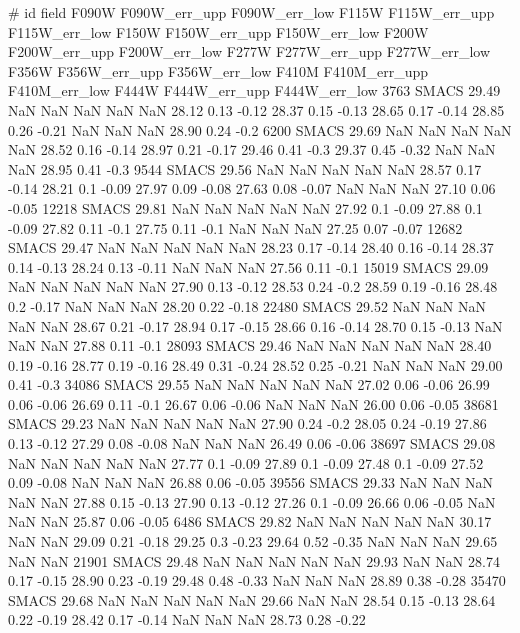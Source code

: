 # id field F090W F090W_err_upp F090W_err_low F115W F115W_err_upp F115W_err_low F150W  F150W_err_upp F150W_err_low F200W  F200W_err_upp F200W_err_low F277W  F277W_err_upp F277W_err_low F356W  F356W_err_upp F356W_err_low F410M  F410M_err_upp F410M_err_low F444W F444W_err_upp F444W_err_low
3763   SMACS   29.49 NaN NaN    NaN NaN NaN  28.12 0.13 -0.12    28.37 0.15 -0.13    28.65 0.17 -0.14    28.85 0.26 -0.21    NaN NaN NaN   28.90 0.24 -0.2
6200   SMACS   29.69 NaN NaN    NaN NaN NaN  28.52 0.16 -0.14    28.97 0.21 -0.17    29.46 0.41 -0.3    29.37 0.45 -0.32    NaN NaN NaN   28.95 0.41 -0.3
		9544   SMACS   29.56 NaN NaN   NaN NaN NaN  28.57 0.17 -0.14    28.21 0.1 -0.09    27.97 0.09 -0.08    27.63 0.08 -0.07    NaN NaN NaN   27.10 0.06 -0.05
		12218   SMACS   29.81 NaN NaN   NaN NaN NaN  27.92 0.1 -0.09    27.88 0.1 -0.09    27.82 0.11 -0.1    27.75 0.11 -0.1    NaN NaN NaN   27.25 0.07 -0.07
		12682   SMACS   29.47 NaN NaN   NaN NaN NaN  28.23 0.17 -0.14    28.40 0.16 -0.14    28.37 0.14 -0.13    28.24 0.13 -0.11    NaN NaN NaN   27.56 0.11 -0.1
		15019   SMACS   29.09 NaN NaN   NaN NaN NaN  27.90 0.13 -0.12    28.53 0.24 -0.2    28.59 0.19 -0.16    28.48 0.2 -0.17    NaN NaN NaN   28.20 0.22 -0.18
		22480   SMACS   29.52 NaN NaN   NaN NaN NaN  28.67 0.21 -0.17    28.94 0.17 -0.15    28.66 0.16 -0.14    28.70 0.15 -0.13    NaN NaN NaN   27.88 0.11 -0.1
		28093   SMACS   29.46 NaN NaN   NaN NaN NaN  28.40 0.19 -0.16    28.77 0.19 -0.16    28.49 0.31 -0.24    28.52 0.25 -0.21    NaN NaN NaN   29.00 0.41 -0.3
		34086   SMACS   29.55 NaN NaN   NaN NaN NaN  27.02 0.06 -0.06    26.99 0.06 -0.06    26.69 0.11 -0.1    26.67 0.06 -0.06    NaN NaN NaN   26.00 0.06 -0.05
		38681   SMACS   29.23 NaN NaN   NaN NaN NaN  27.90 0.24 -0.2    28.05 0.24 -0.19    27.86 0.13 -0.12    27.29 0.08 -0.08    NaN NaN NaN   26.49 0.06 -0.06
		38697   SMACS   29.08 NaN NaN   NaN NaN NaN   27.77 0.1 -0.09    27.89 0.1 -0.09    27.48 0.1 -0.09    27.52 0.09 -0.08    NaN NaN NaN   26.88 0.06 -0.05
		39556   SMACS   29.33 NaN NaN   NaN NaN NaN   27.88 0.15 -0.13    27.90 0.13 -0.12    27.26 0.1 -0.09    26.66 0.06 -0.05    NaN NaN NaN   25.87 0.06 -0.05
		6486   SMACS   29.82 NaN NaN   NaN NaN NaN  30.17 NaN NaN    29.09 0.21 -0.18    29.25 0.3 -0.23    29.64 0.52 -0.35    NaN NaN NaN   29.65 NaN NaN
		21901   SMACS   29.48 NaN NaN   NaN NaN NaN  29.93 NaN NaN   28.74 0.17 -0.15    28.90 0.23 -0.19    29.48 0.48 -0.33    NaN NaN NaN   28.89 0.38 -0.28
		35470   SMACS   29.68 NaN NaN   NaN NaN NaN  29.66 NaN NaN   28.54 0.15 -0.13    28.64 0.22 -0.19    28.42 0.17 -0.14    NaN NaN NaN   28.73 0.28 -0.22
